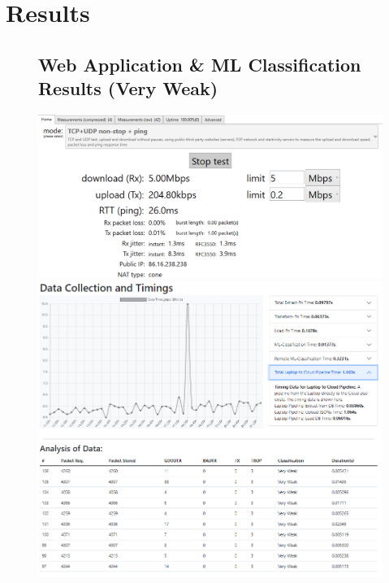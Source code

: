 \chapter{Results} \label{appendix:Results}


\begin{figure}
\begin{minipage}{\linewidth}
\section{Web Application \& ML Classification Results (Very Weak) }
    \centering
    \includegraphics[width=1\linewidth]{images/5mbps.PNG}
    \includegraphics[width=1\linewidth]{images/veryWeak.PNG}
    \label{appendix:VeryWeakData}
\end{minipage}
\end{figure}

